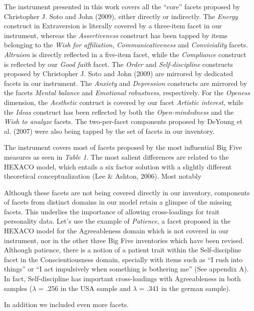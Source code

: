\documentclass[,man,floatsintext]{apa6}
\begin{document}
The instrument presented in this work covers all the \enquote{core}
facets proposed by Christopher J. Soto and John (2009), either directly
or indirectly. The \emph{Energy} construct in Extraversion is literally
covered by a three-item facet in our instrument, whereas the
\emph{Assertiveness} construct has been tapped by items belonging to the
\emph{Wish for affiliation}, \emph{Communicativeness} and
\emph{Conviviality} facets. \emph{Altruism} is directly reflected in a
five-item facet, while the \emph{Compliance} construct is reflected by
our \emph{Good faith} facet. The \emph{Order} and \emph{Self-discipline}
constructs proposed by Christopher J. Soto and John (2009) are mirrored
by dedicated facets in our instrument. The \emph{Anxiety} and
\emph{Depression} constructs are mirrored by the facets \emph{Mental
balance} and \emph{Emotional robustness}, respectively. For the
\emph{Openess} dimension, the \emph{Aesthetic} contruct is covered by
our facet \emph{Artistic interest}, while the \emph{Ideas} construct has
been reflected by both the \emph{Open-mindedness} and the \emph{Wish to
analyze} facets. The two-per-facet components proposed by DeYoung et al.
(2007) were also being tapped by the set of facets in our inventory.

The instrument covers most of facets proposed by the most influential
Big Five measures as seen in \emph{Table 1}. The most salient
differences are related to the HEXACO model, which entails a six factor
solution with a slightly different theoretical conceptualization (Lee \&
Ashton, 2006). Most notably

Although these facets are not being covered directly in our inventory,
components of facets from distinct domains in our model retain a glimpse
of the missing facets. This underlies the importance of allowing
cross-loadings for trait personality data. Let's use the example of
\emph{Patience}, a facet proposed in the HEXACO model for the
Agreeableness domain which is not covered in our instrument, nor in the
other three Big Five inventories which have been revised. Although
patience, there is a notion of a patient trait within the
Self-discipline facet in the Conscientiousness domain, specially with
items such as \enquote{I rush into things} or \enquote{I act impulsively
when something is bothering me} (See appendix A). In fact,
Self-discipline has important cross-loadings with Agreeableness in both
samples (\(\lambda\) = .256 in the USA sample and \(\lambda\) = .341 in
the german sample).

In addition we included even more facets.
\end{document}
